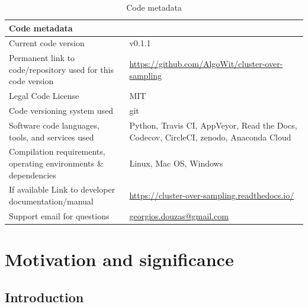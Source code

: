 \documentclass[preprint,12pt, a4paper]{elsarticle}
\begin{document}
\begin{table}[H]
	\begin{tabular}{|p{6.5cm}|p{6.5cm}|}
		\hline
		Code metadata                                                    &                                                                                       \\
		\hline
		Current code version                                             & v0.1.1                                                                                \\
		\hline
		Permanent link to code/repository used for this code version     & \url{https://github.com/AlgoWit/cluster-over-sampling}                                \\
		\hline
		Legal Code License                                               & MIT                                                                                   \\
		\hline
		Code versioning system used                                      & git                                                                                   \\
		\hline
		Software code languages, tools, and services used                & Python, Travis CI, AppVeyor, Read the Docs, Codecov, CircleCI, zenodo, Anaconda Cloud \\
		\hline
		Compilation requirements, operating environments \& dependencies & Linux, Mac OS, Windows                                                                \\
		\hline
		If available Link to developer documentation/manual              & \url{https://cluster-over-sampling.readthedocs.io/}                                   \\
		\hline
		Support email for questions                                      & \href{mailto:georgios.douzas@gmail.com}{georgios.douzas@gmail.com}                    \\
		\hline
	\end{tabular}
	\caption{Code metadata}
	\label{}
\end{table}

\linenumbers


\section{Motivation and significance}
\label{motivation}

\subsection{Introduction}
\label{introduction}
\end{document}

